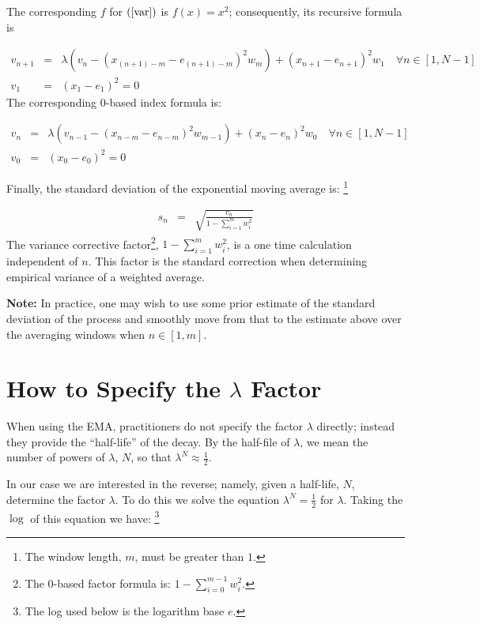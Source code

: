 \documentclass{article}
\begin{document}
The corresponding $f$ for $(\ref{var})$ is $f(x) = x^2$; 
consequently, its recursive formula is 

\begin{eqnarray}
    v_{n+1} &=& \lambda \left( v_n -  ( x_{(n+1)-m} - e_{(n+1)-m} )^2 w_m \right) + ( x_{n+1} - e_{n+1} )^2 w_1 \quad \forall n \in [1, N-1] \\
    v_1     &=&  (x_1 - e_1)^2 = 0 
\end{eqnarray}
The corresponding 0-based index formula is:

\begin{eqnarray}
    v_{n} &=& \lambda \left( v_{n-1} - ( x_{n-m} - e_{n-m} )^2 w_{m-1}\right) + ( x_{n} - e_{n} )^2 w_0 \quad \forall n \in [1, N-1] \\
    v_0   &=& (x_0 - e_0)^2 = 0 
\end{eqnarray}

Finally, the standard deviation of the exponential moving average is:%
\footnote{The window length, $m$, must be greater than $1$.}

\begin{eqnarray}
    s_{n} &=& \sqrt{\frac{v_n}{1 - \sum_{i=1}^m w_i^2}}  
\end{eqnarray}
The variance corrective factor\footnote{The 0-based factor formula is: $1 - \sum_{i=0}^{m-1} w_i^2$.}, $1 - \sum_{i=1}^m w_i^2$,
is a one time calculation independent of $n$. This factor is the standard 
correction when determining empirical variance of a weighted average.

{\bf Note:\/} In practice, one may wish to use some prior estimate of the standard deviation of the process
and smoothly move from that to the estimate above over the averaging windows when $n \in [1, m]$.


\section{How to Specify the $\lambda$ Factor}
When using the EMA, practitioners do not specify the factor $\lambda$ directly; 
instead they provide the ``half-life'' of the decay.
By the half-file of $\lambda$, we mean the number of powers of $\lambda$, $N$, so that
$\lambda^N \approx \frac{1}{2}$. 

In our case we are interested in the reverse; namely, given a half-life, $N$, 
determine the factor $\lambda$. To do this we solve the equation $\lambda^N = \frac{1}{2}$
for $\lambda$.
Taking the $\log$ of this equation we have:%
\footnote{The log used below is the logarithm base $e$.}
\end{document}
